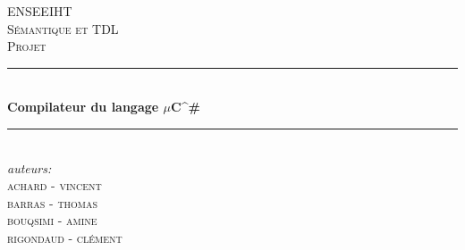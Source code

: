 \documentclass{report}
\begin{document}
\begin{titlepage}

\newcommand{\HRule}{\rule{\linewidth}{0.5mm}} %

\center %
 

\textsc{\LARGE ENSEEIHT}\\[1.5cm] %
\textsc{\Large Sémantique et TDL}\\[0.5cm] %
\textsc{\large Projet}\\[0.5cm] %


\HRule \\[0.4cm]
{ \huge \bfseries  Compilateur du langage $\mu$C^{\#}}\\[0.4cm] %
\HRule \\[1.5cm]
 

\emph{auteurs:}\\
\textsc{achard} - \textsc{vincent} \\
\textsc{barras} - \textsc{thomas} \\
\textsc{bouqsimi} - \textsc{amine} \\
\textsc{rigondaud} - \textsc{clément} \\


\date{} %


\vspace{7.2cm}
\begin{center}
\end{center}


\vfill %

\end{titlepage}
\end{document}
